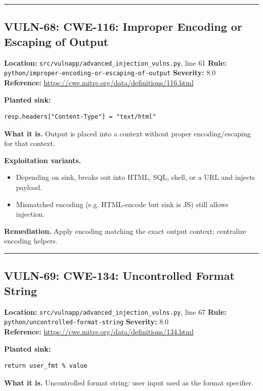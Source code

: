 \documentclass[11pt,a4paper]{article}
\begin{document}
\vspace{4pt}\hrule\vspace{6pt}
\subsection{VULN-68: CWE-116: Improper Encoding or Escaping of Output}
\noindent\textbf{Location:} \texttt{src/vulnapp/advanced\_injection\_vulns.py}, line 61 \quad \textbf{Rule:} \texttt{python/improper-encoding-or-escaping-of-output} \quad \textbf{Severity:} 8.0
\\ \textbf{Reference:} \url{https://cwe.mitre.org/data/definitions/116.html}

\noindent\textbf{Planted sink:}
\begin{lstlisting}
resp.headers["Content-Type"] = "text/html"
\end{lstlisting}
\noindent\textbf{What it is.} Output is placed into a context without proper encoding/escaping for that context.

\noindent\textbf{Exploitation variants.}
\begin{itemize}[leftmargin=1.4em,itemsep=1pt,topsep=2pt]
\item Depending on sink, breaks out into HTML, SQL, shell, or a URL and injects payload.
\item Mismatched encoding (e.g. HTML-encode but sink is JS) still allows injection.
\end{itemize}
\noindent\textbf{Remediation.} Apply encoding matching the exact output context; centralize encoding helpers.

\vspace{4pt}\hrule\vspace{6pt}
\subsection{VULN-69: CWE-134: Uncontrolled Format String}
\noindent\textbf{Location:} \texttt{src/vulnapp/advanced\_injection\_vulns.py}, line 67 \quad \textbf{Rule:} \texttt{python/uncontrolled-format-string} \quad \textbf{Severity:} 8.0
\\ \textbf{Reference:} \url{https://cwe.mitre.org/data/definitions/134.html}

\noindent\textbf{Planted sink:}
\begin{lstlisting}
return user_fmt % value
\end{lstlisting}
\noindent\textbf{What it is.} Uncontrolled format string: user input used as the format specifier.
\end{document}
